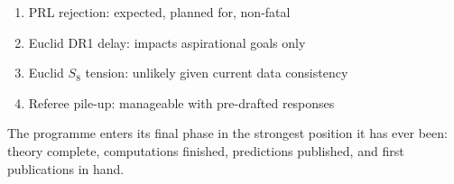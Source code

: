 \documentclass[11pt,a4paper]{article}
\begin{document}
\begin{tcolorbox}[colback=yellow!5!white, colframe=dfdyellow, title=\textbf{Moderate Risks}]
\begin{enumerate}[nosep]
\item PRL rejection: expected, planned for, non-fatal
\item Euclid DR1 delay: impacts aspirational goals only
\item Euclid $S_8$ tension: unlikely given current data consistency
\item Referee pile-up: manageable with pre-drafted responses
\end{enumerate}
\end{tcolorbox}

The programme enters its final phase in the strongest position it has ever been: theory complete, computations finished, predictions published, and first publications in hand.
\end{document}
